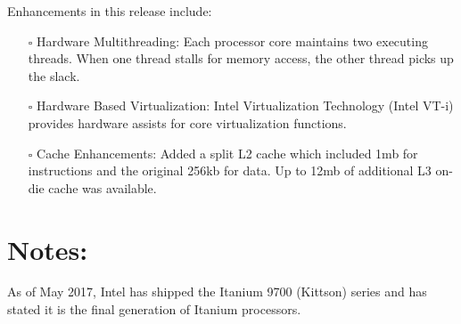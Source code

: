 \documentclass{article}
\begin{document}
Enhancements in this release include:
\begin{itemize}
    \item[$\square$] Hardware Multithreading: Each processor core maintains two executing threads. When one thread stalls for memory access, the other thread picks up the slack.
    \item[$\square$] Hardware Based Virtualization: Intel Virtualization Technology (Intel VT-i) provides hardware assists for core virtualization functions.
    \item[$\square$] Cache Enhancements: Added a split L2 cache which included 1mb for instructions and the original 256kb for data. Up to 12mb of additional L3 on-die cache was available.
\end{itemize}

\section{Notes:}
As of May 2017, Intel has shipped the Itanium 9700 (Kittson) series and has stated it is the final generation of Itanium processors.
\end{document}
